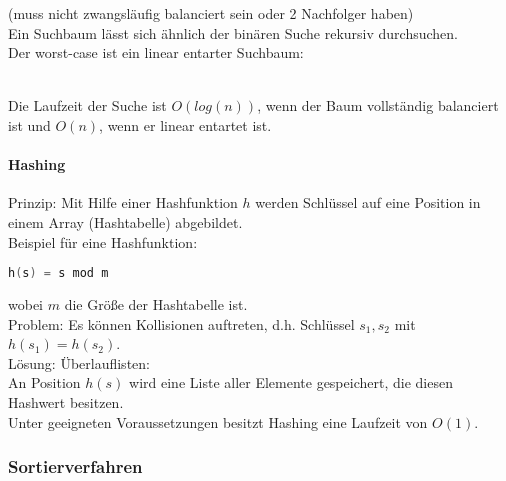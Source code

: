 (muss nicht zwangsläufig balanciert sein oder 2 Nachfolger haben)\\
Ein Suchbaum lässt sich ähnlich der binären Suche rekursiv durchsuchen.\\
Der worst-case ist ein linear entarter Suchbaum:\\
\\
Die Laufzeit der Suche ist $O(log(n))$, wenn der Baum vollständig balanciert ist und $O(n)$, wenn er linear entartet ist.

\paragraph{Hashing}
Prinzip: Mit Hilfe einer Hashfunktion $h$ werden Schlüssel auf eine Position in einem Array (Hashtabelle) abgebildet.\\
Beispiel für eine Hashfunktion:
\begin{lstlisting}[language=C]
h(s) = s mod m
\end{lstlisting}
wobei $m$ die Größe der Hashtabelle ist.\\
Problem: Es können Kollisionen auftreten, d.h. Schlüssel $s_1,s_2$ mit $h(s_1)=h(s_2)$. \\
Lösung: Überlauflisten:\\
An Position $h(s)$ wird eine Liste aller Elemente gespeichert, die diesen Hashwert besitzen.\\
Unter geeigneten Voraussetzungen besitzt Hashing eine Laufzeit von $O(1)$.

\subsubsection{Sortierverfahren}

